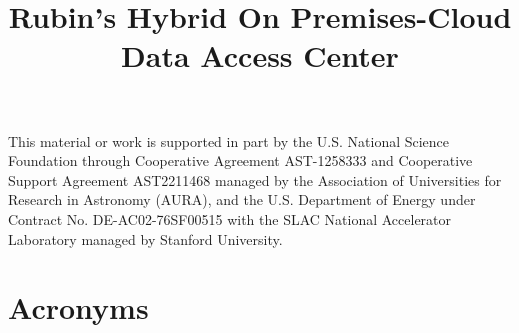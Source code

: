 \documentclass[]{spie}
\begin{document}

\title{Rubin's Hybrid On Premises-Cloud  Data Access Center}

\maketitle





\acknowledgments
This material or work is supported in part by the U.S. National Science Foundation through Cooperative Agreement AST-1258333 and Cooperative Support Agreement AST2211468 managed by the Association of Universities for Research in Astronomy (AURA), and the U.S. Department of Energy under Contract No. DE-AC02-76SF00515 with the SLAC National Accelerator Laboratory managed by Stanford University.

\appendix



\section{Acronyms} \label{sec:acronyms}

\end{document}
